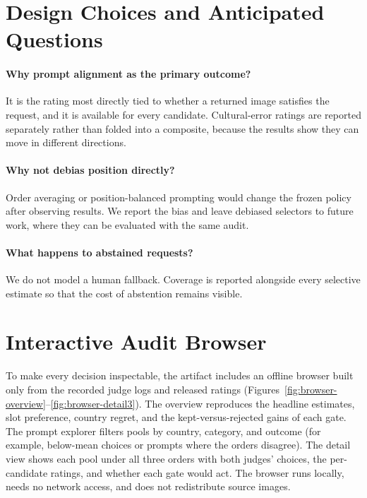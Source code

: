 \documentclass[letterpaper]{article}
\begin{document}
\section{Design Choices and Anticipated Questions}
\paragraph{Why prompt alignment as the primary outcome?} It is the rating most directly tied to whether a returned image satisfies the request, and it is available for every candidate. Cultural-error ratings are reported separately rather than folded into a composite, because the results show they can move in different directions.
\paragraph{Why not debias position directly?} Order averaging or position-balanced prompting would change the frozen policy after observing results. We report the bias and leave debiased selectors to future work, where they can be evaluated with the same audit.
\paragraph{What happens to abstained requests?} We do not model a human fallback. Coverage is reported alongside every selective estimate so that the cost of abstention remains visible.

\section{Interactive Audit Browser}
\label{app:browser}
To make every decision inspectable, the artifact includes an offline browser built only from the recorded judge logs and released ratings (Figures~\ref{fig:browser-overview}--\ref{fig:browser-detail3}). The overview reproduces the headline estimates, slot preference, country regret, and the kept-versus-rejected gains of each gate. The prompt explorer filters pools by country, category, and outcome (for example, below-mean choices or prompts where the orders disagree). The detail view shows each pool under all three orders with both judges' choices, the per-candidate ratings, and whether each gate would act. The browser runs locally, needs no network access, and does not redistribute source images.
\end{document}
